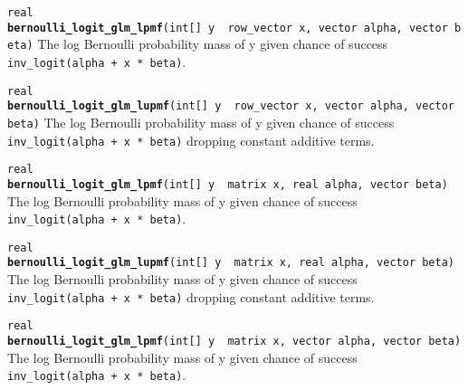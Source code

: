 \documentclass[
  10pt,
]{book}
\begin{document}

\texttt{real} \textbf{\texttt{bernoulli\_logit\_glm\_lpmf}}\texttt{(int{[}{]}\ y\ \textbar{}\ row\_vector\ x,\ vector\ alpha,\ vector\ beta)}\newline
The log Bernoulli probability mass of y given chance of success
\texttt{inv\_logit(alpha\ +\ x\ *\ beta)}.


\texttt{real} \textbf{\texttt{bernoulli\_logit\_glm\_lupmf}}\texttt{(int{[}{]}\ y\ \textbar{}\ row\_vector\ x,\ vector\ alpha,\ vector\ beta)}\newline
The log Bernoulli probability mass of y given chance of success
\texttt{inv\_logit(alpha\ +\ x\ *\ beta)} dropping constant additive terms.


\texttt{real} \textbf{\texttt{bernoulli\_logit\_glm\_lpmf}}\texttt{(int{[}{]}\ y\ \textbar{}\ matrix\ x,\ real\ alpha,\ vector\ beta)}\newline
The log Bernoulli probability mass of y given chance of success
\texttt{inv\_logit(alpha\ +\ x\ *\ beta)}.


\texttt{real} \textbf{\texttt{bernoulli\_logit\_glm\_lupmf}}\texttt{(int{[}{]}\ y\ \textbar{}\ matrix\ x,\ real\ alpha,\ vector\ beta)}\newline
The log Bernoulli probability mass of y given chance of success
\texttt{inv\_logit(alpha\ +\ x\ *\ beta)} dropping constant additive terms.


\texttt{real} \textbf{\texttt{bernoulli\_logit\_glm\_lpmf}}\texttt{(int{[}{]}\ y\ \textbar{}\ matrix\ x,\ vector\ alpha,\ vector\ beta)}\newline
The log Bernoulli probability mass of y given chance of success
\texttt{inv\_logit(alpha\ +\ x\ *\ beta)}.
\end{document}
